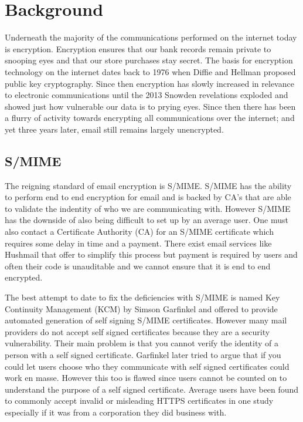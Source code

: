 \documentclass[10pt,twocolumn]{article}
\begin{document}
\section{Background}
\par Underneath the majority of the communications performed on the internet today is encryption. Encryption ensures that our bank records remain private to snooping eyes and that our store purchases stay secret. The basis for encryption technology on the internet dates back to 1976 when Diffie and Hellman proposed public key cryptography. Since then encryption has slowly increased in relevance to electronic communications until the 2013 Snowden revelations exploded and showed just how vulnerable our data is to prying eyes. Since then there has been a flurry of activity towards encrypting all communications over the internet; and yet three years later, email still remains largely unencrypted.
\subsection{S/MIME}
\par The reigning standard of email encryption is S/MIME. S/MIME has the ability to perform end to end encryption for email and is backed by CA's that are able to validate the indentity of who we are communicating with. However S/MIME has the downside of also being difficult to set up by an average user. One must also contact a Certificate Authority (CA) for an S/MIME certificate which requires some delay in time and a payment. There exist email services like Hushmail that offer to simplify this process but payment is required by users and often their code is unauditable and we cannot ensure that it is end to end encrypted.
\par The best attempt to date to fix the deficiencies with S/MIME is named Key Continuity Management (KCM) by Simson Garfinkel and offered to provide automated generation of self signing S/MIME certificates. However many mail providers do not accept self signed certificates because they are a security vulnerability. Their main problem is that you cannot verify the identity of a person with a self signed certificate. Garfinkel later tried to argue that if you could let users choose who they communicate with self signed certificates could work en masse. However this too is flawed since users cannot be counted on to understand the purpose of a self signed certificate. Average users have been found to commonly accept invalid or misleading HTTPS certificates in one study especially if it was from a corporation they did business with.
\end{document}
